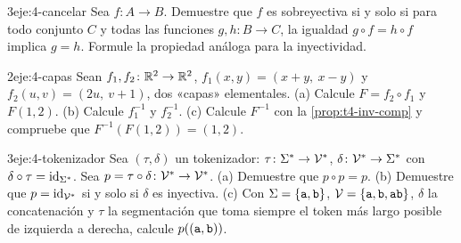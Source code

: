 \begin{ejercicio}{3}{eje:4-cancelar}
Sea $f\colon A\to B$. Demuestre que $f$ es sobreyectiva si y solo si para todo conjunto $C$ y todas las funciones $g,h\colon B\to C$, la igualdad $g\circ f=h\circ f$ implica $g=h$. Formule la propiedad análoga para la inyectividad.
\end{ejercicio}

\begin{ejercicio}{2}{eje:4-capas}
Sean $f_1,f_2\colon\mathbb{R}^{2}\to\mathbb{R}^{2}$, $f_1(x,y)=(x+y,\ x-y)$ y $f_2(u,v)=(2u,\ v+1)$, dos «capas» elementales. (a) Calcule $F=f_2\circ f_1$ y $F(1,2)$. (b) Calcule $f_1^{-1}$ y $f_2^{-1}$. (c) Calcule $F^{-1}$ con la \cref{prop:t4-inv-comp} y compruebe que $F^{-1}(F(1,2))=(1,2)$.
\end{ejercicio}

\begin{ejercicio}{3}{eje:4-tokenizador}
Sea $(\tau,\delta)$ un tokenizador: $\tau\colon\Sigma^{*}\to\mathcal{V}^{*}$, $\delta\colon\mathcal{V}^{*}\to\Sigma^{*}$ con $\delta\circ\tau=\mathrm{id}_{\Sigma^{*}}$. Sea $p=\tau\circ\delta\colon\mathcal{V}^{*}\to\mathcal{V}^{*}$. (a) Demuestre que $p\circ p=p$. (b) Demuestre que $p=\mathrm{id}_{\mathcal{V}^{*}}$ si y solo si $\delta$ es inyectiva. (c) Con $\Sigma=\{\texttt{a},\texttt{b}\}$, $\mathcal{V}=\{\texttt{a},\texttt{b},\texttt{ab}\}$, $\delta$ la concatenación y $\tau$ la segmentación que toma siempre el token más largo posible de izquierda a derecha, calcule $p((\texttt{a},\texttt{b}))$.
\end{ejercicio}

